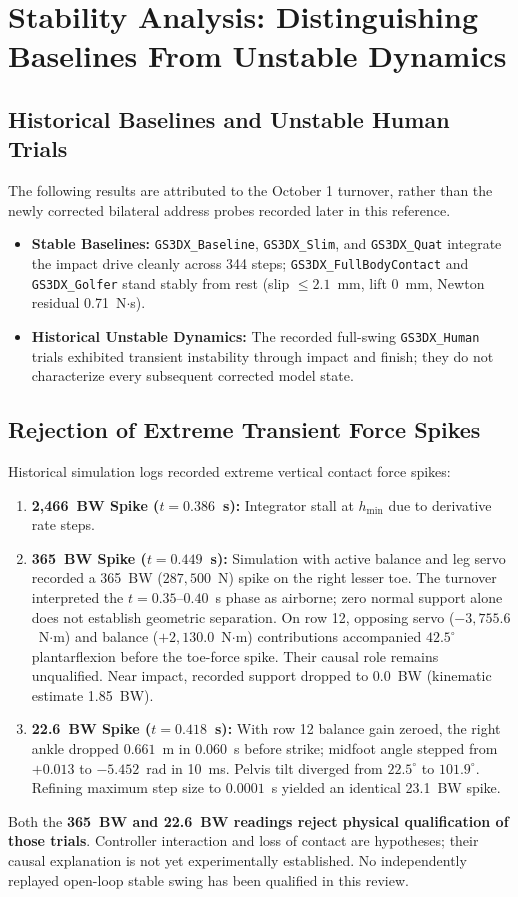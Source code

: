 \documentclass[11pt,a4paper]{article}
\begin{document}
\section{Stability Analysis: Distinguishing Baselines From Unstable Dynamics}

\subsection{Historical Baselines and Unstable Human Trials}
The following results are attributed to the October 1 turnover, rather than
the newly corrected bilateral address probes recorded later in this reference.
\begin{itemize}
    \item \textbf{Stable Baselines:} \texttt{GS3DX\_Baseline}, \texttt{GS3DX\_Slim}, and \texttt{GS3DX\_Quat} integrate the impact drive cleanly across 344 steps; \texttt{GS3DX\_FullBodyContact} and \texttt{GS3DX\_Golfer} stand stably from rest (slip $\le 2.1$~mm, lift 0~mm, Newton residual 0.71~N$\cdot$s).
    \item \textbf{Historical Unstable Dynamics:} The recorded full-swing \texttt{GS3DX\_Human} trials exhibited transient instability through impact and finish; they do not characterize every subsequent corrected model state.
\end{itemize}

\subsection{Rejection of Extreme Transient Force Spikes}
Historical simulation logs recorded extreme vertical contact force spikes:
\begin{enumerate}
    \item \textbf{2,466~BW Spike ($t = 0.386$~s):} Integrator stall at $h_{\min}$ due to derivative rate steps.
    \item \textbf{365~BW Spike ($t = 0.449$~s):}
    Simulation with active balance and leg servo recorded a 365~BW ($287{,}500$~N) spike on the right lesser toe. The turnover interpreted the $t = 0.35$--$0.40$~s phase as airborne; zero normal support alone does not establish geometric separation. On row 12, opposing servo ($-3{,}755.6$~N$\cdot$m) and balance ($+2{,}130.0$~N$\cdot$m) contributions accompanied $42.5^\circ$ plantarflexion before the toe-force spike. Their causal role remains unqualified. Near impact, recorded support dropped to 0.0~BW (kinematic estimate 1.85~BW).
    \item \textbf{22.6~BW Spike ($t = 0.418$~s):}
    With row 12 balance gain zeroed, the right ankle dropped $0.661$~m in $0.060$~s before strike; midfoot angle stepped from $+0.013$ to $-5.452$~rad in 10~ms. Pelvis tilt diverged from $22.5^\circ$ to $101.9^\circ$. Refining maximum step size to $0.0001$~s yielded an identical 23.1~BW spike.
\end{enumerate}
Both the \textbf{365~BW and 22.6~BW readings reject physical qualification of those trials}. Controller interaction and loss of contact are hypotheses; their causal explanation is not yet experimentally established. No independently replayed open-loop stable swing has been qualified in this review.
\end{document}
